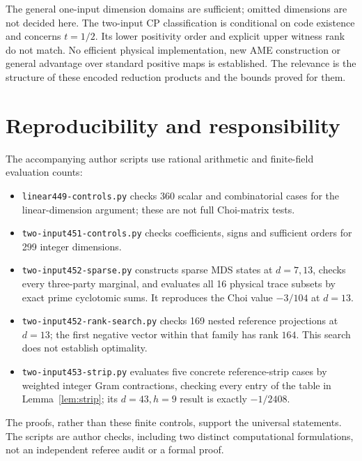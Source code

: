 \documentclass[11pt,a4paper]{article}
\begin{document}
The general one-input dimension domains are sufficient; omitted dimensions are not decided here. The two-input CP classification is conditional on code existence and concerns \(t=1/2\). Its lower positivity order and explicit upper witness rank do not match. No efficient physical implementation, new AME construction or general advantage over standard positive maps is established. The relevance is the structure of these encoded reduction products and the bounds proved for them.

\section{Reproducibility and responsibility}
The accompanying author scripts use rational arithmetic and finite-field evaluation counts:
\begin{itemize}
\item \texttt{linear449-controls.py} checks 360 scalar and combinatorial cases for the linear-dimension argument; these are not full Choi-matrix tests.
\item \texttt{two-input451-controls.py} checks coefficients, signs and sufficient orders for 299 integer dimensions.
\item \texttt{two-input452-sparse.py} constructs sparse MDS states at \(d=7,13\), checks every three-party marginal, and evaluates all 16 physical trace subsets by exact prime cyclotomic sums. It reproduces the Choi value \(-3/104\) at \(d=13\).
\item \texttt{two-input452-rank-search.py} checks 169 nested reference projections at \(d=13\); the first negative vector within that family has rank \(164\). This search does not establish optimality.
\item \texttt{two-input453-strip.py} evaluates five concrete reference-strip cases by weighted integer Gram contractions, checking every entry of the table in Lemma~\ref{lem:strip}; its \(d=43,h=9\) result is exactly \(-1/2408\).
\end{itemize}
The proofs, rather than these finite controls, support the universal statements. The scripts are author checks, including two distinct computational formulations, not an independent referee audit or a formal proof.
\end{document}
